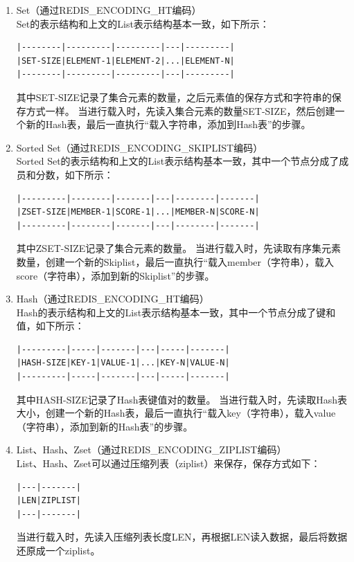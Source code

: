 \documentclass{zjutthesis}
\begin{document}
\begin{enumerate}[label=\arabic*.]
\item{
Set（通过REDIS\_ENCODING\_HT编码）\\
Set的表示结构和上文的List表示结构基本一致，如下所示：
\begin{verbatim}
|--------|---------|---------|---|---------|
|SET-SIZE|ELEMENT-1|ELEMENT-2|...|ELEMENT-N|
|--------|---------|---------|---|---------|
\end{verbatim}
其中SET-SIZE记录了集合元素的数量，之后元素值的保存方式和字符串的保存方式一样。
当进行载入时，先读入集合元素的数量SET-SIZE，然后创建一个新的Hash表，最后一直执行“载入字符串，添加到Hash表”的步骤。
}

\item{
Sorted Set（通过REDIS\_ENCODING\_SKIPLIST编码）\\
Sorted Set的表示结构和上文的List表示结构基本一致，其中一个节点分成了成员和分数，如下所示：
\begin{verbatim}
|---------|--------|-------|---|--------|-------|
|ZSET-SIZE|MEMBER-1|SCORE-1|...|MEMBER-N|SCORE-N|
|---------|--------|-------|---|--------|-------|
\end{verbatim}
其中ZSET-SIZE记录了集合元素的数量。
当进行载入时，先读取有序集元素数量，创建一个新的Skiplist，最后一直执行“载入member（字符串），载入score（字符串），添加到新的Skiplist”的步骤。
}

\item{
Hash（通过REDIS\_ENCODING\_HT编码）\\
Hash的表示结构和上文的List表示结构基本一致，其中一个节点分成了键和值，如下所示：
\begin{verbatim}
|---------|-----|-------|---|-----|-------|
|HASH-SIZE|KEY-1|VALUE-1|...|KEY-N|VALUE-N|
|---------|-----|-------|---|-----|-------|
\end{verbatim}
其中HASH-SIZE记录了Hash表键值对的数量。
当进行载入时，先读取Hash表大小，创建一个新的Hash表，最后一直执行“载入key（字符串），载入value（字符串），添加到新的Hash表”的步骤。
}

\item{
List、Hash、Zset（通过REDIS\_ENCODING\_ZIPLIST编码）\\
List、Hash、Zset可以通过压缩列表（ziplist）来保存，保存方式如下：
\begin{verbatim}
|---|-------|
|LEN|ZIPLIST|
|---|-------|
\end{verbatim}
当进行载入时，先读入压缩列表长度LEN，再根据LEN读入数据，最后将数据还原成一个ziplist。
}


\end{enumerate}
\end{document}

